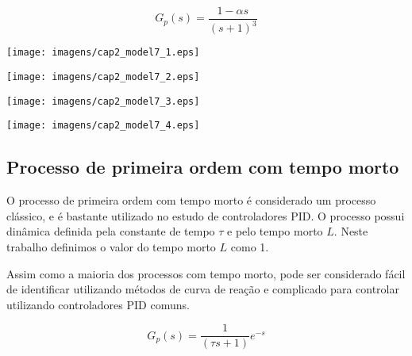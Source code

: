     \begin{equation}
        G_p(s) = \frac{1-\alpha s}{(s+1)^3}
    \end{equation}

    \begin{center}
        \texttt{[image: imagens/cap2\_model7\_1.eps]}
        \label{cap2_11}
    \end{center}

    \begin{center}
        \texttt{[image: imagens/cap2\_model7\_2.eps]}
        \label{cap2_12}
    \end{center}
    
    \begin{center}
        \texttt{[image: imagens/cap2\_model7\_3.eps]}
        \label{cap2_13}
    \end{center}
    
    \begin{center}
        \texttt{[image: imagens/cap2\_model7\_4.eps]}
        \label{cap2_14}
    \end{center}

\subsection{Processo de primeira ordem com tempo morto}

    O processo de primeira ordem com tempo morto é considerado um processo
    clássico, e é bastante utilizado no estudo de controladores \acs{PID}. O
    processo possui dinâmica definida pela constante de tempo $\tau$ e pelo
    tempo morto $L$. Neste trabalho definimos o valor do tempo morto $L$ como 1.
    
    Assim como a maioria dos processos com tempo morto, pode ser considerado
    fácil de identificar utilizando métodos de curva de reação e complicado para
    controlar utilizando controladores \acs{PID} comuns.

    \begin{equation}
        G_p(s) = \frac{1}{(\tau s +1)}e^{-s}
    \end{equation}
    
